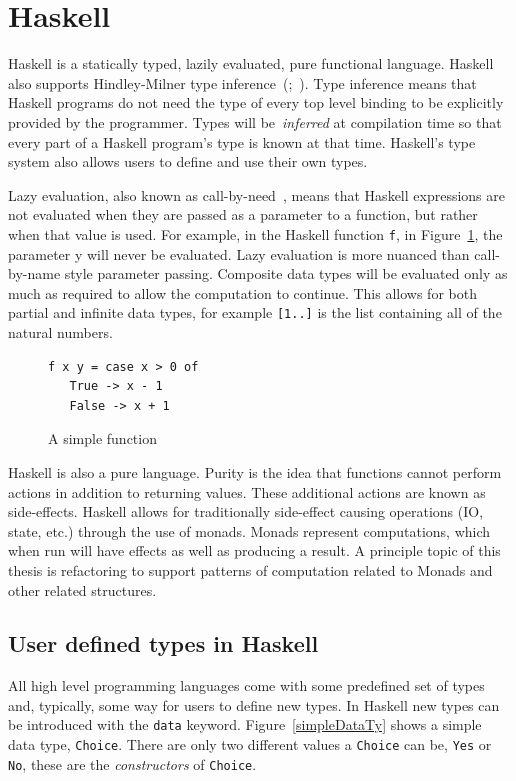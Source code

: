 \section{Haskell}
\label{haskell}
Haskell is a statically typed, lazily evaluated, pure functional language. Haskell also supports Hindley-Milner type inference~(\cite{hindley};~\cite{milner}). Type inference means that Haskell programs do not need the type of every top level binding to be explicitly provided by the programmer. Types will be~\textit{inferred} at compilation time so that every part of a Haskell program's type is known at that time. Haskell's type system also allows users to define and use their own types.

Lazy evaluation, also known as call-by-need~\citep{wadsworth}, means that Haskell expressions are not evaluated when they are passed as a parameter to a function, but rather when that value is used. For example, in the Haskell function \texttt{f}, in Figure~\ref{lazyY}, the parameter y will never be evaluated. Lazy evaluation is more nuanced than call-by-name style parameter passing. Composite data types will be evaluated only as much as required to allow the computation to continue. This allows for both partial and infinite data types, for example \texttt{[1..]} is the list containing all of the natural numbers. 

\begin{figure}[t]
\begin{lstlisting}
f x y = case x > 0 of
   True -> x - 1
   False -> x + 1
\end{lstlisting}
\caption{A simple function}
\label{lazyY}
\end{figure}

Haskell is also a pure language. Purity is the idea that functions cannot perform actions in addition to returning values. These additional actions are known as side-effects. Haskell allows for traditionally side-effect causing operations (IO, state, etc.) through the use of monads. Monads represent computations, which when run will have effects as well as producing a result. A principle topic of this thesis is refactoring to support patterns of computation related to Monads and other related structures.

\subsection{User defined types in Haskell}

All high level programming languages come with some predefined set of types and, typically, some way for users to define new types. In Haskell new types can be introduced with the \texttt{data} keyword. Figure~\ref{simpleDataTy} shows a simple data type, \texttt{Choice}. There are only two different values a \texttt{Choice} can be, \texttt{Yes} or \texttt{No}, these are the \textit{constructors} of \texttt{Choice}. 



